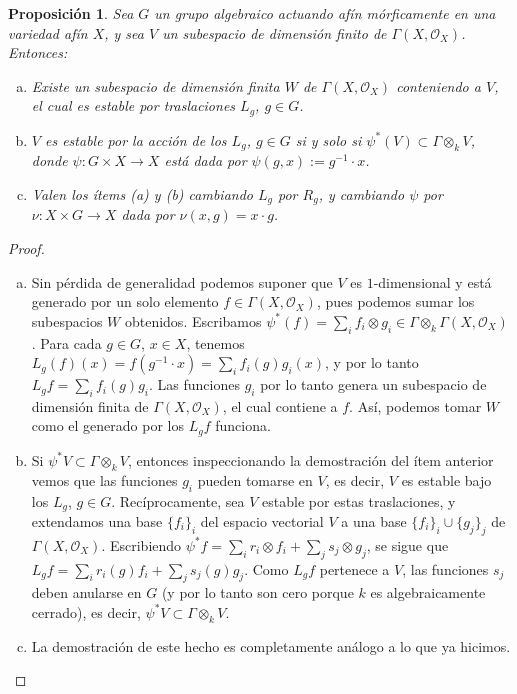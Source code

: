\documentclass[spanish,10pt]{amsart}
\newtheorem{proposition}[theorem]{Proposición}
\theoremstyle{definition}
\theoremstyle{remark}
\numberwithin{equation}{section}
\renewcommand{\O}{\mathcal{O}}
\begin{document}
\begin{proposition}
Sea $G$ un grupo algebraico actuando afín mórficamente en una variedad afín $X$, y sea $V$ un subespacio de dimensión finito de $\Gamma(X, \O_X)$. Entonces:
\begin{enumerate}[(a)]
\item Existe un subespacio de dimensión finita $W$ de $\Gamma (X,\O_X)$ conteniendo a $V$, el cual es estable por traslaciones $L_g$, $g \in G$.
\item $V$ es estable por la acción de los $L_g$, $g \in G$ si y solo si $\psi^{*} (V) \subset \Gamma \otimes_k V$, donde $\psi : G \times X \to X$ está dada por $\psi (g,x) := g^{-1} \cdot x$.
\item Valen los ítems (a) y (b) cambiando $L_g$ por $R_g$, y cambiando $\psi$ por $\nu : X \times G \to X$ dada por $\nu (x, g) = x \cdot g$.
\end{enumerate}
\end{proposition}
\begin{proof}
\begin{enumerate}[(a)]
\item Sin pérdida de generalidad podemos suponer que $V$ es $1$-dimensional y está generado por un solo elemento $f \in \Gamma (X, \O_X)$, pues podemos sumar los subespacios $W$ obtenidos. Escribamos $\psi^* (f) = \sum_i f_i \otimes g_i \in \Gamma \otimes_k \Gamma (X, \O_X)$. Para cada $g\in G$, $x \in X$, tenemos $L_g (f) (x) = f(g^{-1} \cdot x) = \sum_i f_i (g) g_i (x)$, y por lo tanto $L_g f = \sum_i f_i (g) g_i$. Las funciones $g_i$ por lo tanto genera un subespacio de dimensión finita de $\Gamma (X, \O_X)$, el cual contiene a $f$. Así, podemos tomar $W$ como el generado por los $L_g f$ funciona.
\item Si $\psi^* V \subset \Gamma \otimes_k V$, entonces inspeccionando la demostración del ítem anterior vemos que las funciones $g_i$  pueden tomarse en $V$, es decir, $V$ es estable bajo los $L_g$, $g \in G$. Recíprocamente, sea $V$ estable por estas traslaciones, y extendamos una base $\{f_i\}_i$ del espacio vectorial $V$ a una base $\{f_i\}_i \cup \{g_j\}_j$ de $\Gamma (X, \O_X)$. Escribiendo $\psi^* f = \sum_i r_i \otimes f_i + \sum_j s_j \otimes g_j$, se sigue que $L_g f = \sum_i r_i (g) f_i + \sum_j s_j (g) g_j$. Como $L_g f$ pertenece a $V$, las funciones $s_j$ deben anularse en $G$ (y por lo tanto son cero porque $k$ es algebraicamente cerrado), es decir, $\psi^* V \subset \Gamma \otimes_k V$.
\item La demostración de este hecho es completamente análogo a lo que ya hicimos.
\end{enumerate}
\end{proof}
\end{document}
